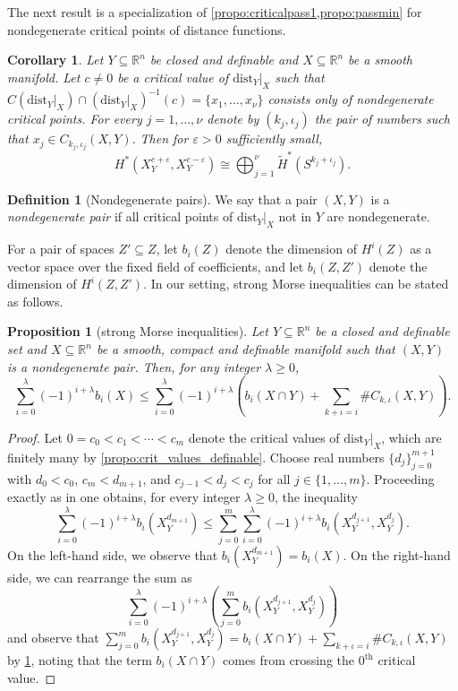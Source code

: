 \documentclass{amsart}
\newcommand{\R}{\mathbb{R}}
\newcommand{\dist}{{\mathrm{dist}_Y|_X}}
\def\lini{k}
\def\quadi{\iota}
\newtheorem{proposition}[subsubsection]{Proposition}
\newtheorem{corollary}[subsubsection]{Corollary}
\theoremstyle{definition}
\newtheorem{definition}[subsubsection]{Definition}
\theoremstyle{remark}
\begin{document}
The next result is a specialization of \cref{propo:criticalpass1,propo:passmin} for nondegenerate critical points of distance functions.
\begin{corollary}
\label{propo:criticalpass2dist}
Let $Y\subseteq \R^n$ be closed and definable and $X\subseteq \R^n$ be a smooth manifold. Let $c\neq 0$ be a critical value of $\dist$ such that 
$C(\dist)\cap (\dist)^{-1}(c)=\{x_1, \ldots, x_\nu\}$ consists only of nondegenerate critical points. For every $j=1, \ldots, \nu$ denote by $(\lini_j, \quadi_j)$ the pair of numbers such that $x_j\in C_{\lini_j, \quadi_j}(X, Y).$
Then for $\varepsilon>0$ sufficiently small, 
\[
H^*(X^{ c+\varepsilon}_Y, X^{c-\varepsilon}_Y)\cong \bigoplus_{j=1}^\nu\widetilde{H}^*(S^{\lini_j+\quadi_j}).
\]
\end{corollary}

\begin{definition}[Nondegenerate pairs]
\label{D:nondegenerate-pairs}
We say that a pair $(X,Y)$ is a \emph{nondegenerate pair} if all critical points of $\dist$ not in $Y$ are nondegenerate.
\end{definition}


For a pair of spaces $Z'\subseteq Z$, let $b_i (Z)$ denote the dimension of $H^i (Z)$ as a vector space over the fixed field of coefficients, and let $b_i (Z,Z')$ denote the dimension of $H^i (Z,Z')$. In our setting, strong Morse inequalities can be stated as follows.  

\begin{proposition}[strong Morse inequalities]
\label{propo:strongMorse}
Let $Y\subseteq \R^n$ be a closed and definable set and $X\subseteq \R^n$ be a smooth, compact and definable manifold such that $(X, Y)$ is a nondegenerate pair. 
Then, for any integer $\lambda \ge 0$, 
\[
\sum_{i=0}^{\lambda} (-1)^{i+\lambda} b_i (X) \le \sum_{i=0}^{\lambda} (-1)^{i+\lambda} \left( b_i (X\cap Y) + \sum_{\lini+\quadi=i} \# C_{\lini,\quadi}(X,Y) \right) .
\]
\end{proposition}

\begin{proof}
\label{prop:Sardproperty}
Let $0=c_0 < c_1 < \cdots < c_m$ denote the critical values of $\dist$, which are finitely many by \cref{propo:crit_values_definable}. Choose real numbers $\{d_j\}_{j=0}^{m+1}$ with $d_0<c_0$, $c_m < d_{m+1}$, and $c_{j-1} < d_j < c_j$ for all $j\in \{1,\ldots ,m\}$. Proceeding exactly as in \cite[Sect.~5]{milnor1963morse} one obtains, for every integer $\lambda \ge 0$, the inequality
\[
\sum_{i=0}^{\lambda} (-1)^{i+\lambda} b_i (X_Y^{d_{m+1}}) \le \sum_{j=0}^{m} \sum_{i=0}^{\lambda} (-1)^{i+\lambda} b_i (X_Y^{d_{j+1}},X_Y^{d_{j}}).
\]
On the left-hand side, we observe that $b_i (X_Y^{d_{m+1}})=b_i (X)$.
On the right-hand side, we can rearrange the sum as 
\[
\sum_{i=0}^{\lambda} (-1)^{i+\lambda} \left( \sum_{j=0}^{m}  b_i (X_Y^{d_{j+1}},X_Y^{d_{j}}) \right)
\]
and observe that $\sum_{j=0}^{m}  b_i (X_Y^{d_{j+1}},X_Y^{d_{j}}) = b_i (X\cap Y) + \sum_{\lini+\quadi=i} \# C_{\lini,\quadi}(X,Y)$ by \cref{propo:criticalpass2dist}, noting that the term $b_i (X\cap Y)$ comes from crossing the $0^{\text{th}}$ critical value. 
\end{proof}
\end{document}
